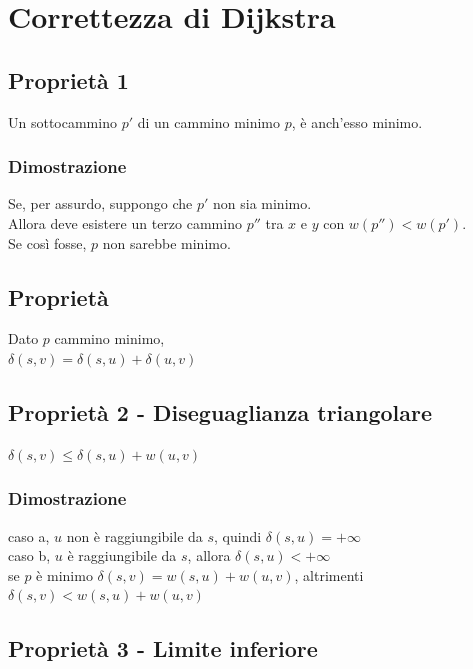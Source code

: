 \documentclass[tikz]{article}
\begin{document}
{{\section{Correttezza di Dijkstra}

\subsection{Proprietà 1}

Un sottocammino $p'$ di un cammino minimo $p$, è anch'esso minimo.

\subsubsection{Dimostrazione}

Se, per assurdo, suppongo che $p'$ non sia minimo.\\
Allora deve esistere un terzo cammino $p''$ tra $x$ e $y$ con $w(p'') < w(p')$.\\
Se così fosse, $p$ non sarebbe minimo.

\subsection{Proprietà}

Dato $p$ cammino minimo, \\
$\delta(s,v)=\delta(s,u)+\delta(u,v)$ \\


\subsection{Proprietà 2 - Diseguaglianza triangolare}

$\delta(s,v)\leq \delta(s,u)+w(u,v)$ \\

\subsubsection{Dimostrazione}

caso a, $u$ non è raggiungibile da $s$, quindi $\delta(s,u) = +\infty$ \\
caso b, $u$ è raggiungibile da $s$, allora $\delta(s,u) < +\infty$ \\

se $p$ è minimo $\delta(s,v)=w(s,u)+w(u,v)$, altrimenti $\delta(s,v)<w(s,u)+w(u,v)$ \\


\subsection{Proprietà 3 - Limite inferiore}

}}
\end{document}

